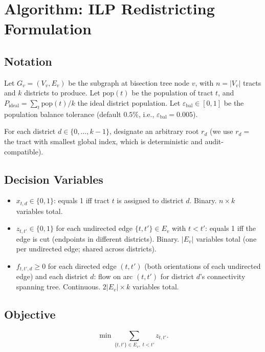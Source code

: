 \section{Algorithm: ILP Redistricting Formulation}
\label{sec:algorithm}

\subsection{Notation}

Let $G_v = (V_v, E_v)$ be the subgraph at bisection tree node $v$, with
$n = |V_v|$ tracts and $k$ districts to produce.
Let $\mathrm{pop}(t)$ be the population of tract $t$, and
$P_{\mathrm{ideal}} = \sum_t \mathrm{pop}(t) / k$ the ideal district
population.
Let $\varepsilon_{\mathrm{bal}} \in [0,1]$ be the population balance
tolerance (default $0.5\%$, i.e., $\varepsilon_{\mathrm{bal}} = 0.005$).

For each district $d \in \{0, \ldots, k-1\}$, designate an arbitrary
root $r_d$ (we use $r_d = $ the tract with smallest global index, which
is deterministic and audit-compatible).

\subsection{Decision Variables}

\begin{itemize}
\item $x_{t,d} \in \{0,1\}$: equals 1 iff tract $t$ is assigned to
  district $d$.
  Binary.
  $n \times k$ variables total.

\item $z_{t,t'} \in \{0,1\}$ for each undirected edge $\{t,t'\} \in E_v$
  with $t < t'$: equals 1 iff the edge is cut (endpoints in different
  districts).
  Binary.
  $|E_v|$ variables total (one per undirected edge; shared across districts).

\item $f_{t,t',d} \geq 0$ for each directed edge $(t,t')$ (both orientations
  of each undirected edge) and each district $d$: flow on arc $(t,t')$ for
  district $d$'s connectivity spanning tree.
  Continuous.
  $2|E_v| \times k$ variables total.
\end{itemize}

\subsection{Objective}

\begin{equation}
\label{eq:objective}
\min \sum_{\{t,t'\} \in E_v,\; t < t'} z_{t,t'}.
\end{equation}

